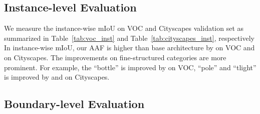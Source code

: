 \subsection{Instance-level Evaluation}
\label{sec:inst_eval}

We measure the instance-wise mIoU on VOC and Cityscapes validation set as summarized in Table~\ref{tab:voc_inst} and Table~\ref{tab:cityscapes_inst}, respectively In instance-wise mIoU, our AAF is higher than base architecture by  on VOC and  on Cityscapes. The improvements on fine-structured categories are more prominent. For example, the ``bottle'' is improved by  on VOC, ``pole'' and ``tlight'' is improved by  and  on Cityscapes.


\subsection{Boundary-level Evaluation}
\label{sec:boundary_eval}

\begin{table*}[b!]
  \centering
    \vspace{0.5pt}
    \caption{Per-class boundary recall results on Pascal VOC 2012 validation set.}
    \label{tab:voc_boundary}
\end{table*}

